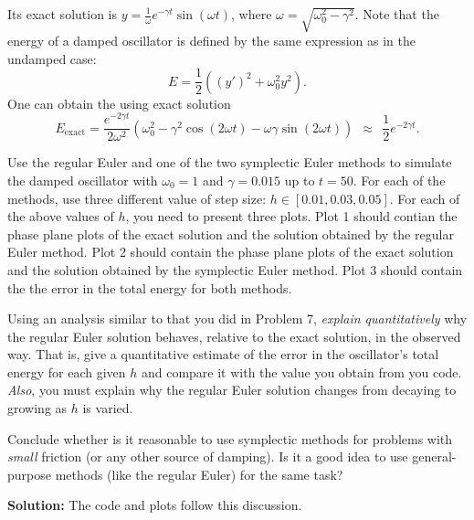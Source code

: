 \documentclass[11pt]{article}
\def\f{\frac }
\begin{document}
\begin{enumerate}
Its exact solution is $y = \f{1}{\omega} e ^{-\gamma t} \sin (\omega t)$, where $\omega = \sqrt{\omega _0 ^2 - \gamma ^2}$.
Note that the energy of a damped oscillator is defined by the same expression as in the undamped case:
\[ E = \f{1}{2} \left ( (y')^2 + \omega _0 ^2 y ^2 \right ).\]
One can obtain the using exact solution
\[ E_\text{exact} = \f{e^{-2\gamma t}}{2\omega ^2}\left ( \omega _0 ^2 - \gamma ^2 \cos (2\omega t) - \omega \gamma \sin (2 \omega t) \right ) ~~\approx~~ \f{1}{2} e^{-2\gamma t}. \]

Use the regular Euler and one of the two symplectic Euler methods to simulate the damped oscillator with $\omega _0 = 1$ and $\gamma = 0.015$ up to $t = 50$.
For each of the methods, use three different value of step size: $h \in [0.01,0.03,0.05]$.
For each of the above values of $h$, you need to present three plots.
Plot 1 should contian the phase plane plots of the exact solution and the solution obtained by the regular Euler method.
Plot 2 should contain the phase plane plots of the exact solution and the solution obtained by the symplectic Euler method.
Plot 3 should contain the the error in the total energy for both methods.

Using an analysis similar to that you did in Problem 7, {\em explain quantitatively} why the regular Euler solution behaves, relative to the exact solution, in the observed way.
That is, give a quantitative estimate of the error in the oscillator's total energy for each given $h$ and compare it with the value you obtain from you code.
{\em Also}, you must explain why the regular Euler solution changes from decaying to growing as $h$ is varied.

Conclude whether is it reasonable to use symplectic methods for problems with {\em small} friction (or any other source of damping).
Is it a good idea to use general-purpose methods (like the regular Euler) for the same task?

\bigskip
\textbf{Solution:} The code and plots follow this discussion.


\end{enumerate}
\end{document}
